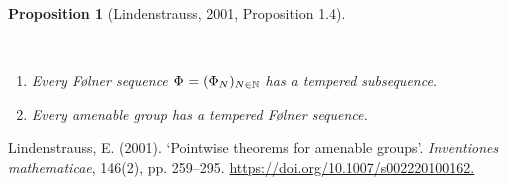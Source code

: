 \documentclass[
  british,
]{article}
\newlength{\cslhangindent}
\newenvironment{CSLReferences}[2] %
 {\begin{list}{}{%
  \setlength{\itemindent}{0pt}
  \setlength{\leftmargin}{0pt}
  \setlength{\parsep}{0pt}
  \ifodd #1
   \setlength{\leftmargin}{\cslhangindent}
   \setlength{\itemindent}{-1\cslhangindent}
  \fi
  \setlength{\itemsep}{#2\baselineskip}}}
 {\end{list}}
\providecommand{\tightlist}{%
  \setlength{\itemsep}{0pt}\setlength{\parskip}{0pt}}
\theoremstyle{definition}
\theoremstyle{plain}
\newtheorem{proposition}{Proposition}[section]
\theoremstyle{remark}
\newcommand{\Folner}[1][\vphantom{}]{{\Phi}_{#1}}
\begin{document}
\begin{proposition}[{Lindenstrauss, 2001, Proposition
1.4}]\protect\hypertarget{prp-temperedFolner}{}\label{prp-temperedFolner}

~

\begin{enumerate}
\def\labelenumi{\arabic{enumi}.}
\tightlist
\item
  Every Følner sequence \(\Folner=(\Folner[N])_{N\in\mathbb{N}}\) has a
  tempered subsequence.
\item
  Every amenable group has a tempered Følner sequence.
\end{enumerate}

\end{proposition}

\protect{}\label{refs}
\begin{CSLReferences}{1}{0}
Lindenstrauss, E. (2001). `Pointwise theorems for amenable groups'.
\emph{Inventiones mathematicae}, 146(2), pp. 259--295.
\href{https://doi.org/10.1007/s002220100162}{https://doi.org/10.1007/s002220100162.}

\end{CSLReferences}
\end{document}

